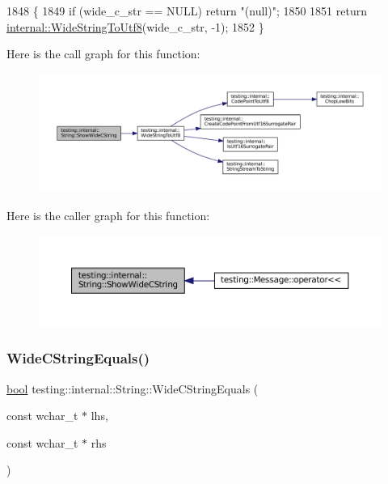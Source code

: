 \begin{DoxyCode}
1848                                                             \{
1849   \textcolor{keywordflow}{if} (wide\_c\_str == NULL)  \textcolor{keywordflow}{return} \textcolor{stringliteral}{"(null)"};
1850 
1851   \textcolor{keywordflow}{return} \hyperlink{namespacetesting_1_1internal_a05b8c86ff38243f34d8f839a0eadefb1}{internal::WideStringToUtf8}(wide\_c\_str, -1);
1852 \}
\end{DoxyCode}
Here is the call graph for this function\+:
\nopagebreak
\begin{figure}[H]
\begin{center}
\leavevmode
\includegraphics[width=350pt]{classtesting_1_1internal_1_1String_aaf7e376ff580677ea4954d5913d5b917_cgraph}
\end{center}
\end{figure}
Here is the caller graph for this function\+:
\nopagebreak
\begin{figure}[H]
\begin{center}
\leavevmode
\includegraphics[width=350pt]{classtesting_1_1internal_1_1String_aaf7e376ff580677ea4954d5913d5b917_icgraph}
\end{center}
\end{figure}
\mbox{\label{classtesting_1_1internal_1_1String_ab0373bf6e96453d6ca0de2e68df13d3a}} 
\subsubsection{\texorpdfstring{Wide\+C\+String\+Equals()}{WideCStringEquals()}}
{\footnotesize\ttfamily \hyperlink{classbool}{bool} testing\+::internal\+::\+String\+::\+Wide\+C\+String\+Equals (\begin{DoxyParamCaption}\item[{const wchar\+\_\+t $\ast$}]{lhs,  }\item[{const wchar\+\_\+t $\ast$}]{rhs }\end{DoxyParamCaption})\hspace{0.3cm}{\ttfamily [static]}}



